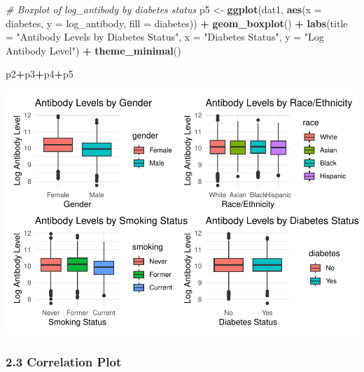 \documentclass[
]{article}
\newenvironment{Shaded}{\begin{snugshade}}{\end{snugshade}}
\newcommand{\AttributeTok}[1]{\textcolor[rgb]{0.13,0.29,0.53}{#1}}
\newcommand{\CommentTok}[1]{\textcolor[rgb]{0.56,0.35,0.01}{\textit{#1}}}
\newcommand{\FunctionTok}[1]{\textcolor[rgb]{0.13,0.29,0.53}{\textbf{#1}}}
\newcommand{\NormalTok}[1]{#1}
\newcommand{\OtherTok}[1]{\textcolor[rgb]{0.56,0.35,0.01}{#1}}
\newcommand{\SpecialCharTok}[1]{\textcolor[rgb]{0.81,0.36,0.00}{\textbf{#1}}}
\newcommand{\StringTok}[1]{\textcolor[rgb]{0.31,0.60,0.02}{#1}}
\begin{document}
\begin{Shaded}
\begin{Highlighting}[]
\CommentTok{\# Boxplot of log\_antibody by diabetes status}
\NormalTok{p5 }\OtherTok{\textless{}{-}} \FunctionTok{ggplot}\NormalTok{(dat1, }\FunctionTok{aes}\NormalTok{(}\AttributeTok{x =}\NormalTok{ diabetes, }\AttributeTok{y =}\NormalTok{ log\_antibody, }\AttributeTok{fill =}\NormalTok{ diabetes)) }\SpecialCharTok{+}
  \FunctionTok{geom\_boxplot}\NormalTok{() }\SpecialCharTok{+}
  \FunctionTok{labs}\NormalTok{(}\AttributeTok{title =} \StringTok{"Antibody Levels by Diabetes Status"}\NormalTok{,}
       \AttributeTok{x =} \StringTok{"Diabetes Status"}\NormalTok{, }
       \AttributeTok{y =} \StringTok{"Log Antibody Level"}\NormalTok{) }\SpecialCharTok{+}
  \FunctionTok{theme\_minimal}\NormalTok{()}
\end{Highlighting}
\end{Shaded}

\begin{Shaded}
\begin{Highlighting}[]
\NormalTok{p2}\SpecialCharTok{+}\NormalTok{p3}\SpecialCharTok{+}\NormalTok{p4}\SpecialCharTok{+}\NormalTok{p5}
\end{Highlighting}
\end{Shaded}

\includegraphics{p8106_midterm_project_files/figure-latex/unnamed-chunk-11-1.pdf}

\subsubsection{2.3 Correlation Plot}\label{correlation-plot}
\end{document}
